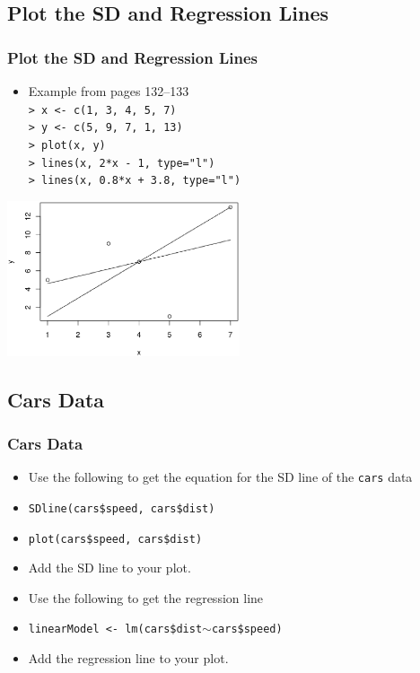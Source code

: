 \documentclass[t]{beamer}
\begin{document}
\subsection{Plot the SD and Regression Lines}
\begin{frame}\frametitle{Plot the SD and Regression Lines}
{\small
\begin{itemize}
\item Example from pages 132--133\\
   \texttt{> x <- c(1, 3, 4, 5, 7)}\\
   \texttt{> y <- c(5, 9, 7, 1, 13)}\\
   \texttt{> plot(x, y)}\\
   \texttt{> lines(x, 2*x - 1, type="l")}\\
   \texttt{> lines(x, 0.8*x + 3.8, type="l")}%
\end{itemize}
\begin{center}
\includegraphics[height=1.8in,bb=-0 -0 515 350,clip]{Regress1.eps}
\end{center}

}
\end{frame}

\subsection{Cars Data}
\begin{frame}\frametitle{Cars Data}
{\small
\begin{itemize}
\item Use the following to get the equation for the SD line of the
   \texttt{cars} data
\item \texttt{SDline(cars\$speed, cars\$dist)}\\
\item \texttt{plot(cars\$speed, cars\$dist)}\\
\item Add the SD line to your plot.
\item Use the following to get the regression line
\item \texttt{linearModel <- lm(cars\$dist$\sim$cars\$speed)}
\item Add the regression line to your plot.
\end{itemize}
}
\label{lastpage}
\end{frame}
\end{document}
